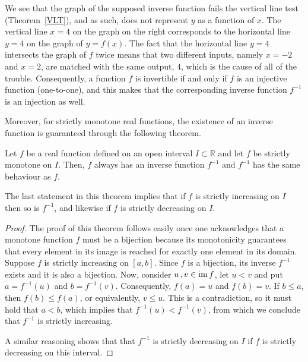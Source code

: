 We see that the graph of the supposed inverse function fails the vertical line test (Theorem~\ref{VLT}), and as such, does not represent $y$ as a function of $x$.  The vertical line $x=4$ on the graph on the right corresponds to the horizontal line $y=4$ on the graph of $y=f(x)$.  The fact that the horizontal line $y=4$ intersects the graph of $f$ twice means that two different inputs, namely $x=-2$ and $x=2$, are matched with the same output, $4$, which is the cause of all of the trouble.  Consequently,  a function $f$ is invertible if and only if $f$ is an injective function (one-to-one), and this makes that the corresponding inverse function $f^{-1}$ is an injection as well. 

\ifcourse
\ifanalysis

Moreover, for strictly monotone real functions, the existence of an inverse function is guaranteed through the following theorem.
\begin{theorem}
Let $f$ be a real function defined on an open interval $I\subset\mathbb{R}$ and let $f$ be strictly monotone on $I$. Then, $f$ always has an inverse function $f^{-1}$ and $f^{-1}$ has the same behaviour as $f$. 
\end{theorem}

The last statement in this theorem implies that if $f$ is strictly increasing on $I$ then so is $f^{-1}$, and likewise if $f$ is strictly decreasing on $I$.

\begin{proof}
The proof of this theorem follows easily once one acknowledges that a monotone function $f$ must be a bijection because  its monotonicity guarantees that every element in its image is reached for exactly one element in its domain.  %
Suppose $f$ is strictly increasing on $[a,b]$. Since $f$ is a bijection, its inverse $f^{-1}$ exists and it is also a bijection. Now, consider $u\,,v\in\text{im}{\,}f$, let $u<v$ and put $a=f^{-1}(u)$ and $b=f^{-1}(v)$. Consequently, $f(a)=u$ and $f(b)=v$. If $b\leq a$, then $f(b)\leq f(a)$, or equivalently, $v\leq u$. This is a contradiction, so it must hold that $a<b$, which implies that $f^{-1}(u)<f^{-1}(v)$, from which we conclude that $f^{-1}$ is strictly increasing.

%
%
A similar reasoning shows that that $f^{-1}$ is strictly decreasing on $I$ if $f$ is strictly decreasing on this interval.
\end{proof}


